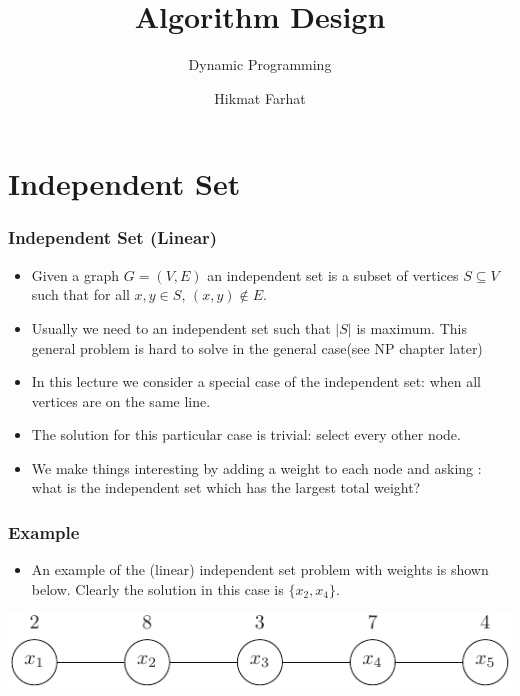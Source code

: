 \documentclass{beamer}
\title{Algorithm Design}
\subtitle{Dynamic Programming}
\author{Hikmat Farhat}
\begin{document}
\date{}

\frame{\titlepage}

\section{Independent Set}
\begin{frame}
  \frametitle{Independent Set (Linear)}
  \begin{itemize}
  \item Given a graph $G=(V,E)$ an independent set is a subset of vertices $S\subseteq V$ such that for all $x,y\in S$, $(x,y)\notin E$.
  \item Usually we need to an independent set such that $|S|$ is maximum. This general problem is hard to solve in the general case(see NP chapter later)
  \item In this lecture we consider a special case of the independent set: when all vertices are on the same line.
  \item The solution for this particular case is trivial: select every other node.
 \item We make things interesting by adding a weight to each node and asking : what is the independent set which has the largest total weight?
  \end{itemize}
\end{frame}

\begin{frame}
  \frametitle{Example}
  \begin{itemize}
  \item An example of the (linear) independent set problem with weights is shown below. Clearly the solution in this case is $\{x_2,x_4\}$.
  \end{itemize}
\includegraphics[width=\textwidth]{dp-figs/independent}
\end{frame}
\end{document}
